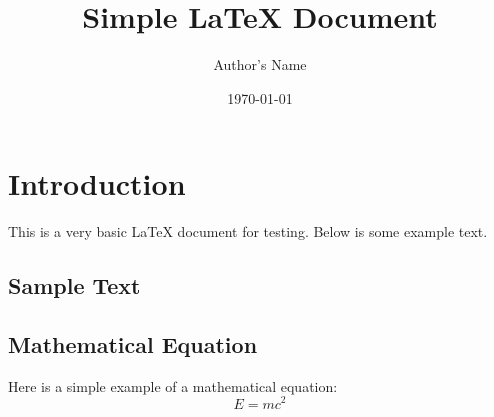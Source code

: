 \documentclass[12pt]{article}
\title{Simple LaTeX Document}
\author{Author's Name}
\date{\today}
\begin{document}
\maketitle

\section{Introduction}
This is a very basic LaTeX document for testing. Below is some example text.

\subsection{Sample Text}

\subsection{Mathematical Equation}
Here is a simple example of a mathematical equation:
\begin{equation}
    E = mc^2
\end{equation}
\end{document}
